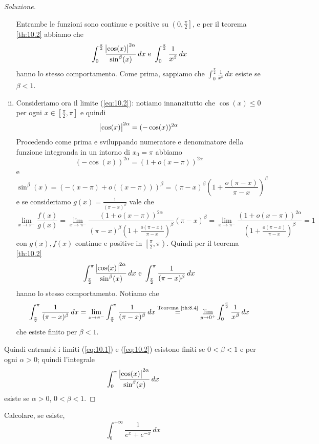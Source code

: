\begin{proof}[Soluzione]
\begin{enumerate}[(i)]
\[        \]
        Entrambe le funzioni sono continue e positive su $\left(0, \frac{\pi}{2}\right]$, e per il teorema \ref{th:10.2} abbiamo che
        \[
        \int_0^{\frac{\pi}{2}} \frac{\abs{\cos(x)}^{2\alpha}}{\sin^\beta(x)}\, dx \ \text{e} \ \int_0^{\frac{\pi}{2}}\frac{1}{x^\beta}\, dx
        \]
        hanno lo stesso comportamento. Come prima, sappiamo che $\int_0^{\frac{\pi}{2}} \frac{1}{x^\beta}\, dx$ esiste se $\beta<1$.
        \item Consideriamo ora il limite (\ref{eq:10.2}): notiamo innanzitutto che $\cos(x)\le0$ per ogni $x\in\left[\frac{\pi}{2}, \pi\right]$ e quindi
        \[
        \abs{\cos(x)}^{2\alpha} = (-\cos(x))^{2\alpha}
        \]
        Procedendo come prima e sviluppando numeratore e denominatore della funzione integranda in un intorno di $x_0=\pi$ abbiamo
        \[
        (-\cos(x))^{2\alpha} = (1+o(x-\pi))^{2\alpha}
        \]
        e
        \[
        \sin^\beta(x) = \left(-(x-\pi)+o((x-\pi)) \right)^\beta = (\pi-x)^\beta\left(1+\frac{o(\pi-x)}{\pi-x}\right)^\beta
        \]
        e se consideriamo $g(x) = \frac{1}{(\pi-x)^\beta}$ vale che
        \[
        \lim_{x\to \pi^-} \frac{f(x)}{g(x)} = \lim_{x\to \pi^-} \frac{(1+o(x-\pi))^{2\alpha}}{(\pi-x)^\beta \left(1+\frac{o(\pi-x)}{\pi-x}\right)^\beta} (\pi-x)^\beta = \lim_{x\to \pi^-} \frac{(1+o(x-\pi))^{2\alpha}}{\left(1+\frac{o(\pi-x)}{\pi-x}\right)^\beta} = 1 
        \]
        con $g(x), f(x)$ continue e positive in $\left[\frac{\pi}{2}, \pi\right)$. Quindi per il teorema \ref{th:10.2}
        \[
        \int_{\frac{\pi}{2}}^\pi \frac{\abs{\cos(x)}^{2\alpha}}{\sin^\beta(x)}\, dx \ \text{e} \ \int_{\frac{\pi}{2}}^\pi \frac{1}{(\pi-x)^\beta}\, dx 
        \]
        hanno lo stesso comportamento. Notiamo che
        \[
        \int_{\frac{\pi}{2}}^\pi \frac{1}{(\pi-x)^\beta}\, dx = \lim_{z\to \pi^-}\int_{\frac{\pi}{2}}^\pi \frac{1}{(\pi-x)^\beta}\, dx \overset{\text{Teorema \ref{th:8.4}}}{=} \lim_{y\to 0^+}\int_0^{\frac{\pi}{2}} \frac{1}{x^\beta}\, dx
        \]
        che esiste finito per $\beta<1$.
    \end{enumerate}
    Quindi entrambi i limiti (\ref{eq:10.1}) e (\ref{eq:10.2}) esistono finiti se $0<\beta<1$ e per ogni $\alpha>0$; quindi l'integrale
    \[
    \int_0^\pi \frac{\abs{\cos(x)}^{2\alpha}}{\sin^\beta(x)}\, dx
    \]
    esiste se $\alpha>0$, $0<\beta<1$.
\end{proof}
\begin{exercise}
    \label{ex:10.3}
    Calcolare, se esiste,
    \[
    \int_0^{+\infty}\frac{1}{e^x+e^{-x}}\, dx
    \]
\end{exercise}
